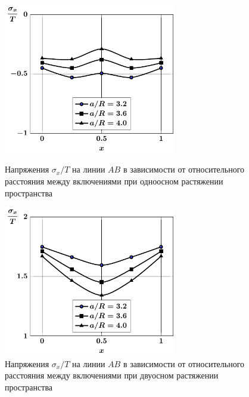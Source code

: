 \begin{russian}
\begin{figure}[h!]
\centering\footnotesize
\parbox[b]{7.5cm}{\centering\includegraphics[width=7.5cm]{inc5-a-d95-g25-t1-ab-sig_x.pdf}
\caption{Напряжения $\sigma_x/T$ на линии  $AB$ в зависимости от относительного расстояния между включениями при одноосном растяжении пространства
\label{f:8:54}}}\hfil\hfil
\parbox[b]{7.5cm}{\centering\includegraphics[width=7.5cm]{inc5-a-d95-g25-t2-ab-sig_x.pdf}
\caption{Напряжения $\sigma_x/T$ на линии  $AB$ в зависимости от относительного расстояния между включениями при двуосном растяжении пространства
\label{f:8:55}}}
\end{figure}


\end{russian}
